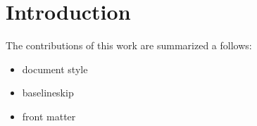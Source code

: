 \section{Introduction}


The contributions of this work are summarized a follows:
\begin{itemize}
\item document style
\item baselineskip
\item front matter
\end{itemize}